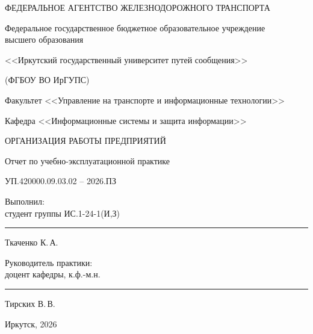 \documentclass[14pt,a4paper]{extarticle}
\newcommand{\DocCode}{УП.420000.09.03.02 – 2026.ПЗ}
\begin{document}
\begin{titlepage}
\begin{center}

ФЕДЕРАЛЬНОЕ АГЕНТСТВО ЖЕЛЕЗНОДОРОЖНОГО ТРАНСПОРТА

\vspace{0.3cm}

Федеральное государственное бюджетное образовательное учреждение\\
высшего образования

\vspace{0.3cm}

<<Иркутский государственный университет путей сообщения>>

\vspace{0.3cm}

(ФГБОУ ВО ИрГУПС)

\vspace{0.3cm}

Факультет <<Управление на транспорте и информационные технологии>>

\vspace{0.1cm}

Кафедра <<Информационные системы и защита информации>>

\vspace{2cm}

ОРГАНИЗАЦИЯ РАБОТЫ ПРЕДПРИЯТИЙ

\vspace{0.3cm}

Отчет по учебно-эксплуатационной практике

\vspace{0.3cm}

\DocCode

\vspace{2cm}

\end{center}

\noindent
\begin{minipage}[t]{0.48\textwidth}
Выполнил:\\
студент группы ИС.1-24-1(И,З)\\[0.3cm]
\rule{3.5cm}{0.4pt} Ткаченко К.\,А.\\[-0.1cm]
\hspace{0.8cm}{\tiny (подпись)}
\end{minipage}%
\hfill
\begin{minipage}[t]{0.48\textwidth}
Руководитель практики:\\
доцент кафедры, к.ф.-м.н.\\[0.3cm]
\rule{3.5cm}{0.4pt} Тирских В.\,В.\\[-0.1cm]
\hspace{0.8cm}{\tiny (подпись)}
\end{minipage}

\begin{center}

\vfill

Иркутск, 2026

\end{center}
\end{titlepage}
\end{document}

